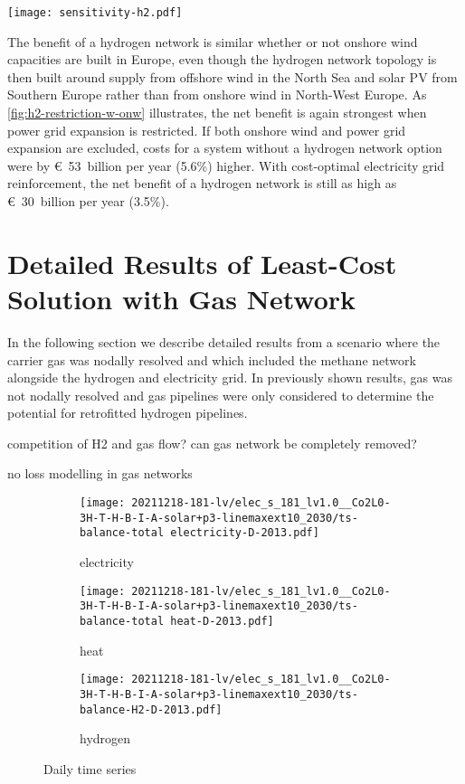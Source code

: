 \begin{SCfigure}
    \centering
    \texttt{[image: sensitivity-h2.pdf]}
    \caption{Sensitivity of hydrogen network infrastructure.}
    \label{fig:h2-restriction-w-onw}
\end{SCfigure}

The benefit of a hydrogen network is similar whether or not onshore wind
capacities are built in Europe, even though the hydrogen network topology is
then built around supply from offshore wind in the North Sea and solar PV from
Southern Europe rather than from onshore wind in North-West Europe. As
\cref{fig:h2-restriction-w-onw} illustrates, the net benefit is again strongest
when power grid expansion is restricted. If both onshore wind and power grid
expansion are excluded, costs for a system without a hydrogen network option
were by \euro~53~billion per year (5.6\%) higher. With cost-optimal electricity
grid reinforcement, the net benefit of a hydrogen network is still as high as
\euro~30~billion per year (3.5\%).

\section{Detailed Results of Least-Cost Solution with Gas Network}
\label{sec:si:detailed}

In the following section we describe detailed results from a scenario where the
carrier gas was nodally resolved and which included the methane network
alongside the hydrogen and electricity grid. In previously shown results, gas
was not nodally resolved and gas pipelines were only considered to determine the
potential for retrofitted hydrogen pipelines.

competition of H2 and gas flow? can gas network be completely removed?

no loss modelling in gas networks

\begin{figure}
    \centering
    \begin{subfigure}[t]{\textwidth}
        \centering
        \caption{electricity}
        \texttt{[image: 20211218-181-lv/elec\_s\_181\_lv1.0\_\_Co2L0-3H-T-H-B-I-A-solar+p3-linemaxext10\_2030/ts-balance-total electricity-D-2013.pdf]}
    \end{subfigure}
    \begin{subfigure}[t]{\textwidth}
        \centering
        \caption{heat}
        \texttt{[image: 20211218-181-lv/elec\_s\_181\_lv1.0\_\_Co2L0-3H-T-H-B-I-A-solar+p3-linemaxext10\_2030/ts-balance-total heat-D-2013.pdf]}
    \end{subfigure}
    \begin{subfigure}[t]{\textwidth}
        \centering
        \caption{hydrogen}
        \texttt{[image: 20211218-181-lv/elec\_s\_181\_lv1.0\_\_Co2L0-3H-T-H-B-I-A-solar+p3-linemaxext10\_2030/ts-balance-H2-D-2013.pdf]}
    \end{subfigure}
    \caption{Daily time series}
    \label{fig:output-ts-1}
\end{figure}

